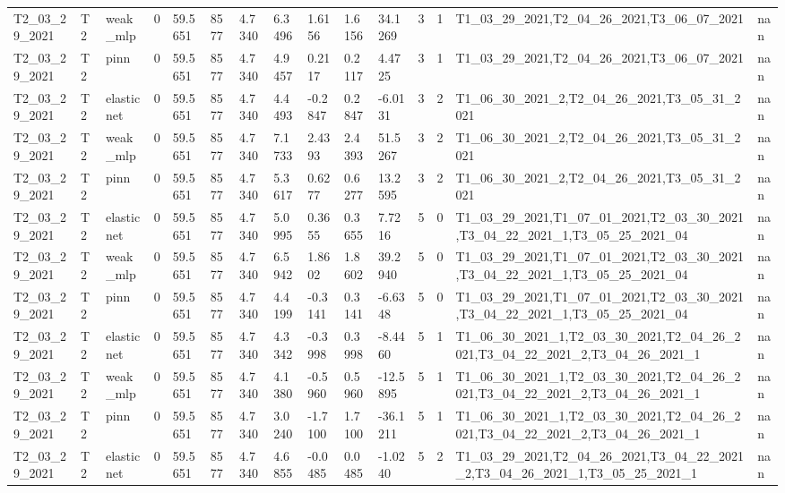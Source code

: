 \begin{table}[t]
\begin{tabular}{lllllllllllllll}
T2\_03\_29\_2021 & T2 & weak\_mlp & 0 & 59.5651 & 8577 & 4.7340 & 6.3496 & 1.6156 & 1.6156 & 34.1269 & 3 & 1 & T1\_03\_29\_2021,T2\_04\_26\_2021,T3\_06\_07\_2021 & nan \\
T2\_03\_29\_2021 & T2 & pinn & 0 & 59.5651 & 8577 & 4.7340 & 4.9457 & 0.2117 & 0.2117 & 4.4725 & 3 & 1 & T1\_03\_29\_2021,T2\_04\_26\_2021,T3\_06\_07\_2021 & nan \\
T2\_03\_29\_2021 & T2 & elasticnet & 0 & 59.5651 & 8577 & 4.7340 & 4.4493 & -0.2847 & 0.2847 & -6.0131 & 3 & 2 & T1\_06\_30\_2021\_2,T2\_04\_26\_2021,T3\_05\_31\_2021 & nan \\
T2\_03\_29\_2021 & T2 & weak\_mlp & 0 & 59.5651 & 8577 & 4.7340 & 7.1733 & 2.4393 & 2.4393 & 51.5267 & 3 & 2 & T1\_06\_30\_2021\_2,T2\_04\_26\_2021,T3\_05\_31\_2021 & nan \\
T2\_03\_29\_2021 & T2 & pinn & 0 & 59.5651 & 8577 & 4.7340 & 5.3617 & 0.6277 & 0.6277 & 13.2595 & 3 & 2 & T1\_06\_30\_2021\_2,T2\_04\_26\_2021,T3\_05\_31\_2021 & nan \\
T2\_03\_29\_2021 & T2 & elasticnet & 0 & 59.5651 & 8577 & 4.7340 & 5.0995 & 0.3655 & 0.3655 & 7.7216 & 5 & 0 & T1\_03\_29\_2021,T1\_07\_01\_2021,T2\_03\_30\_2021,T3\_04\_22\_2021\_1,T3\_05\_25\_2021\_04 & nan \\
T2\_03\_29\_2021 & T2 & weak\_mlp & 0 & 59.5651 & 8577 & 4.7340 & 6.5942 & 1.8602 & 1.8602 & 39.2940 & 5 & 0 & T1\_03\_29\_2021,T1\_07\_01\_2021,T2\_03\_30\_2021,T3\_04\_22\_2021\_1,T3\_05\_25\_2021\_04 & nan \\
T2\_03\_29\_2021 & T2 & pinn & 0 & 59.5651 & 8577 & 4.7340 & 4.4199 & -0.3141 & 0.3141 & -6.6348 & 5 & 0 & T1\_03\_29\_2021,T1\_07\_01\_2021,T2\_03\_30\_2021,T3\_04\_22\_2021\_1,T3\_05\_25\_2021\_04 & nan \\
T2\_03\_29\_2021 & T2 & elasticnet & 0 & 59.5651 & 8577 & 4.7340 & 4.3342 & -0.3998 & 0.3998 & -8.4460 & 5 & 1 & T1\_06\_30\_2021\_1,T2\_03\_30\_2021,T2\_04\_26\_2021,T3\_04\_22\_2021\_2,T3\_04\_26\_2021\_1 & nan \\
T2\_03\_29\_2021 & T2 & weak\_mlp & 0 & 59.5651 & 8577 & 4.7340 & 4.1380 & -0.5960 & 0.5960 & -12.5895 & 5 & 1 & T1\_06\_30\_2021\_1,T2\_03\_30\_2021,T2\_04\_26\_2021,T3\_04\_22\_2021\_2,T3\_04\_26\_2021\_1 & nan \\
T2\_03\_29\_2021 & T2 & pinn & 0 & 59.5651 & 8577 & 4.7340 & 3.0240 & -1.7100 & 1.7100 & -36.1211 & 5 & 1 & T1\_06\_30\_2021\_1,T2\_03\_30\_2021,T2\_04\_26\_2021,T3\_04\_22\_2021\_2,T3\_04\_26\_2021\_1 & nan \\
T2\_03\_29\_2021 & T2 & elasticnet & 0 & 59.5651 & 8577 & 4.7340 & 4.6855 & -0.0485 & 0.0485 & -1.0240 & 5 & 2 & T1\_03\_29\_2021,T2\_04\_26\_2021,T3\_04\_22\_2021\_2,T3\_04\_26\_2021\_1,T3\_05\_25\_2021\_1 & nan \\

\end{tabular}
\end{table}
